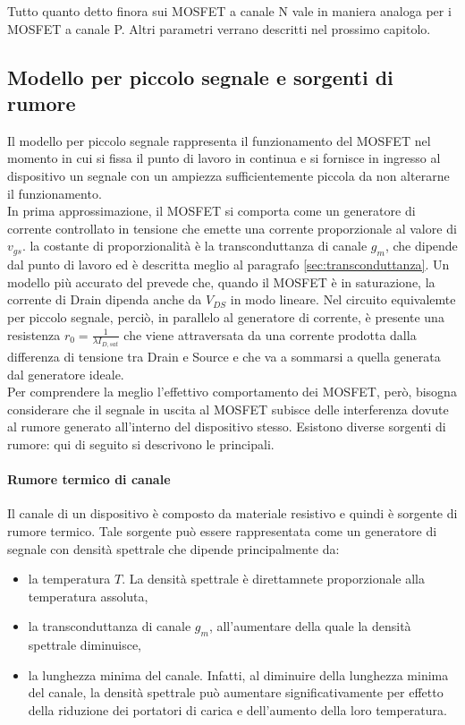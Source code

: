 Tutto quanto detto finora sui MOSFET a canale N vale in maniera analoga per i MOSFET a canale P.
Altri parametri verrano descritti nel prossimo capitolo.

\subsection{Modello per piccolo segnale e sorgenti di rumore}
Il modello per piccolo segnale rappresenta il funzionamento del MOSFET nel momento in cui si fissa il punto di lavoro in continua e si fornisce in ingresso al dispositivo un segnale con un ampiezza sufficientemente piccola da non alterarne il funzionamento. \\
In prima approssimazione, il MOSFET si comporta come un generatore di corrente controllato in tensione che emette una corrente proporzionale al valore di $v_{gs}$. la costante di proporzionalità è la transconduttanza di canale $g_m$, che dipende dal punto di lavoro ed è descritta meglio al paragrafo \ref{sec:transconduttanza}. Un modello più accurato del prevede che, quando il MOSFET è in saturazione, la corrente di Drain dipenda anche da $V_{DS}$ in modo lineare. Nel circuito equivalemte per piccolo segnale, perciò, in parallelo al generatore di corrente, è presente una resistenza $r_0 = \frac{1}{\lambda I_{D,sat}}$ che viene attraversata da una corrente prodotta dalla differenza di tensione tra Drain e Source e che va a sommarsi a quella generata dal generatore ideale.\\

Per comprendere la meglio l'effettivo comportamento dei MOSFET, però, bisogna considerare che il segnale in uscita al MOSFET subisce delle interferenza dovute al rumore generato all'interno del dispositivo stesso. Esistono diverse sorgenti di rumore: qui di seguito si descrivono le principali.

\paragraph*{Rumore termico di canale}
Il canale di un dispositivo è composto da materiale resistivo e quindi è sorgente di rumore termico. Tale sorgente può essere rappresentata come un generatore di segnale con densità spettrale che dipende principalmente da:

\begin{itemize}
  \item la temperatura $T$. La densità spettrale è direttamnete proporzionale alla temperatura assoluta,
  \item la transconduttanza di canale $g_m$, all'aumentare della quale la densità spettrale diminuisce,
  \item la lunghezza minima del canale. Infatti, al diminuire della lunghezza minima del canale, la densità spettrale può aumentare significativamente per effetto della riduzione dei portatori di carica e dell'aumento della loro temperatura.
\end{itemize}

